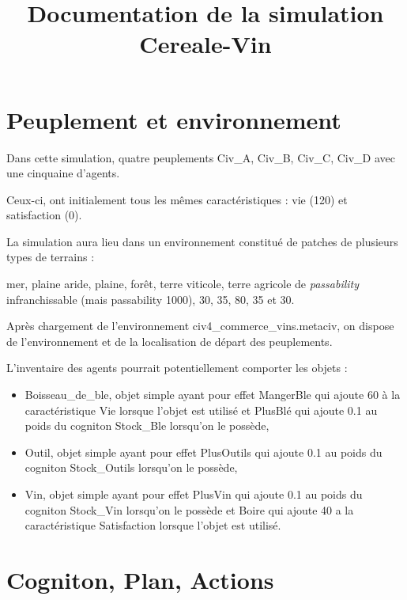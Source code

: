 \documentclass[a4paper,oneside,12 pt]{article}
\title{Documentation de la simulation Cereale-Vin }
\begin{document}
\maketitle



\clearpage 
\section{Peuplement et environnement}
Dans cette simulation, quatre peuplements Civ\_A, Civ\_B, Civ\_C, Civ\_D avec une cinquaine d'agents.

Ceux-ci, ont initialement tous les mêmes caractéristiques : vie (120) et satisfaction (0).

La simulation aura lieu dans un environnement constitué de patches de plusieurs types de  terrains : 

mer, plaine aride, plaine, forêt, terre viticole, terre agricole  de \textit{passability} infranchissable (mais passability 1000), 30, 35, 80, 35 et 30.

Après chargement de l'environnement civ4\_commerce\_vins.metaciv, on dispose de l'environnement et de la localisation de départ des peuplements.

L'inventaire des agents pourrait potentiellement comporter les objets :
\begin{itemize}
\item Boisseau\_de\_ble, objet simple ayant pour effet MangerBle qui ajoute 60 à la caractéristique Vie lorsque l'objet est utilisé et PlusBlé qui ajoute 0.1 au poids du cogniton Stock\_Ble lorsqu'on le possède, 
\item Outil, objet simple ayant pour effet PlusOutils qui ajoute 0.1 au poids du cogniton Stock\_Outils lorsqu'on le possède, 
\item Vin, objet simple ayant pour effet PlusVin qui ajoute 0.1 au poids du cogniton Stock\_Vin lorsqu'on le possède et Boire qui ajoute 40 a la caractéristique Satisfaction lorsque l'objet est utilisé.
\end{itemize}

\clearpage

\section{Cogniton, Plan, Actions}
\end{document}
